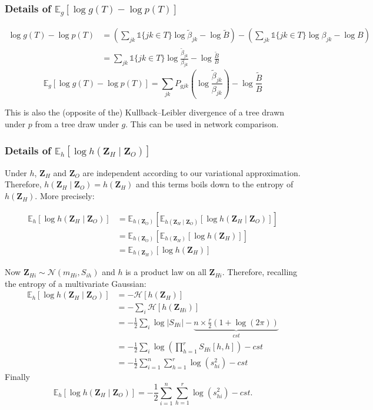\documentclass[11pt,a4paper]{article}
\newcommand{\entr}{\mathcal{H}}
\newcommand{\Zbf}{\boldsymbol{Z}}
\newcommand{\Esp}{\mathds{E}}
\begin{document}
\subsubsection{Details of $\Esp_g[\log g(T) - \log p(T)]$}
\begin{align*}
\log g(T) - \log p(T) &= \left(  \sum_{jk} \mathds{1}\{jk \in T\} \log \widetilde{\beta}_{jk} - \log \widetilde{B}\right) - \left(  \sum_{jk} \mathds{1}\{jk \in T\} \log {\beta}_{jk} - \log {B}\right)\\
&=\sum_{jk} \mathds{1}\{jk \in T\} \log \frac{\widetilde{\beta}_{jk}}{{\beta}_{jk}} - \log \frac{\widetilde{B}}{B}
\end{align*}
$$\boxed{
\Esp_g[\log g(T) - \log p(T)] = \sum_{jk}P_{gjk} \left(\log \frac{\widetilde{\beta}_{jk}}{{\beta}_{jk}}\right) - \log \frac{\widetilde{B}}{B} }$$

 
This is also the (opposite of the) Kullback–Leibler divergence of a tree drawn under $p$ from a tree draw under $g$. This can be used in network comparison.


\subsubsection{Details of $\Esp_h[\log h(\Zbf_H\mid \Zbf_O)]$}
Under $h$, $\Zbf_H$ and $\Zbf_O$ are independent according to our variational approximation. Therefore, $h(\Zbf_H\mid \Zbf_O) = h(\Zbf_H)$ and this terms boils down to the entropy of $h(\Zbf_H)$. More precisely:

\begin{align*}
\Esp_h[\log h(\Zbf_H\mid \Zbf_O)] &= \Esp_{h(\Zbf_O)}\left[\Esp_{h(\Zbf_H\mid \Zbf_O)}[\log h(\Zbf_H\mid \Zbf_O)]\right]\\
&=\Esp_{h(\Zbf_O)}\left[\Esp_{h(\Zbf_H)}[\log h(\Zbf_H)]\right]\\
&=\Esp_{h(\Zbf_H)}[\log h(\Zbf_H)]  
\end{align*}


Now $\Zbf_{Hi} \sim \mathcal{N}(m_{Hi},S_{ih})$ and $h$ is a product law on all $\Zbf_{Hi}$. Therefore, recalling the entropy of a multivariate Gaussian:
\begin{align*}
\Esp_h[\log h(\Zbf_H\mid \Zbf_O)]  &= - \entr[h(\Zbf_H)] \\
&= -\sum_i \entr[h(\Zbf_{Hi})] \\
&=-\frac{1}{2} \sum_i\log |S_{Hi}| -\underbrace{n\times  \frac{r}{2}(1+\log(2\pi))}_{cst}\\
&= -\frac{1}{2} \sum_i \log \left(\prod_{h=1}^r S_{Hi}[h,h] \right)-cst\\
&= -\frac{1}{2}\sum_{i=1}^n \sum_{h=1}^r \log(s_{hi}^2)-cst
\end{align*}
Finally $$\boxed{ \Esp_h[\log h(\Zbf_H\mid \Zbf_O)] = -\frac{1}{2}\sum_{i=1}^n \sum_{h=1}^r \log(s_{hi}^2) -cst}.$$
\end{document}
